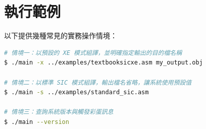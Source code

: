 \section{執行範例}
以下提供幾種常見的實務操作情境：

\begin{lstlisting}[language=bash, caption={執行範例}, frame=single]
# 情境一：以預設的 XE 模式組譯，並明確指定輸出的目的檔名稱
$ ./main -x ../examples/textbooksicxe.asm my_output.obj

# 情境二：以標準 SIC 模式組譯，輸出檔名省略，讓系統使用預設值
$ ./main -s ../examples/standard_sic.asm

# 情境三：查詢系統版本與觸發彩蛋訊息
$ ./main --version
\end{lstlisting}

